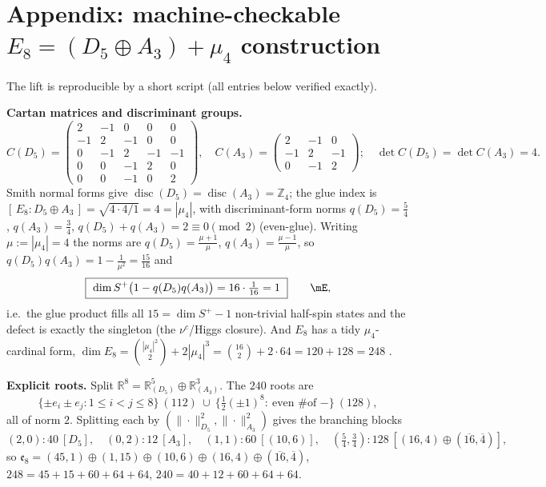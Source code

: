 \section*{Appendix: machine-checkable $E_8=(D_5\oplus A_3)+\mu_4$ construction}
The lift is reproducible by a short script (all entries below verified exactly).

\smallskip
\noindent\textbf{Cartan matrices and discriminant groups.}
\[
  C(D_5)=\begin{pmatrix}2&-1&0&0&0\\-1&2&-1&0&0\\0&-1&2&-1&-1\\0&0&-1&2&0\\0&0&-1&0&2\end{pmatrix},\quad
  C(A_3)=\begin{pmatrix}2&-1&0\\-1&2&-1\\0&-1&2\end{pmatrix};\quad
  \det C(D_5)=\det C(A_3)=4 .
\]
Smith normal forms give $\operatorname{disc}(D_5)=\operatorname{disc}(A_3)=\mathbb Z_4$; the glue index is
$[\,E_8:D_5\oplus A_3\,]=\sqrt{4\cdot4/1}=4=|\mu_4|$, with discriminant-form norms $q(D_5)=\tfrac54$,
$q(A_3)=\tfrac34$, $q(D_5)+q(A_3)=2\equiv0\pmod 2$ (even-glue). Writing $\mu:=|\mu_4|=4$ the norms are
$q(D_5)=\tfrac{\mu+1}{\mu}$, $q(A_3)=\tfrac{\mu-1}{\mu}$, so $q(D_5)q(A_3)=1-\tfrac1{\mu^2}=\tfrac{15}{16}$ and
\begin{equation}
  \boxed{\ \dim S^+\bigl(1-q(D_5)q(A_3)\bigr)=16\cdot\tfrac1{16}=1\ }\qquad\mE ,
\end{equation}
i.e.\ the glue product fills all $15=\dim S^+{-}1$ non-trivial half-spin states and the defect is exactly
the singleton (the $\nu^c$/Higgs closure). And $E_8$ has a tidy $\mu_4$-cardinal form,
$\dim E_8=\binom{|\mu_4|^2}{2}+2|\mu_4|^3=\binom{16}{2}+2\cdot64=120+128=248$ \mC.

\smallskip
\noindent\textbf{Explicit roots.} Split $\mathbb R^8=\mathbb R^5_{(D_5)}\oplus\mathbb R^3_{(A_3)}$. The
$240$ roots are
\[
  \{\pm e_i\pm e_j:1\le i<j\le 8\}\ (112)\ \cup\ \{\tfrac12(\pm1)^8:\ \text{even \# of }-\}\ (128),
\]
all of norm $2$. Splitting each by $(\|\cdot\|^2_{D_5},\|\cdot\|^2_{A_3})$ gives the branching blocks
\[
  (2,0)\!:40\ [D_5],\quad (0,2)\!:12\ [A_3],\quad (1,1)\!:60\ [(10,6)],\quad
  (\tfrac54,\tfrac34)\!:128\ [(16,4)\oplus(\overline{16},\overline4)] ,
\]
so $\mathfrak e_8=(45,1)\oplus(1,15)\oplus(10,6)\oplus(16,4)\oplus(\overline{16},\overline4)$,
$248=45{+}15{+}60{+}64{+}64$, $240=40{+}12{+}60{+}64{+}64$.

